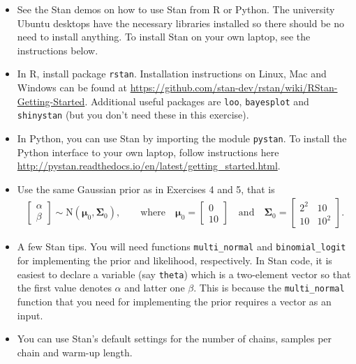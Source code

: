 \documentclass[a4paper,11pt]{article}
\newcommand{\vc}[1] { \mathbf{#1} }
\newcommand{\vs}[1] { \boldsymbol{#1} }
\begin{document}
\begin{itemize}
\item See the Stan demos on how to use Stan from R or Python. The university Ubuntu desktops have the necessary libraries installed so there should be no need to install anything. To install Stan on your own laptop, see the instructions below.

\item In R, install package {\tt rstan}. Installation instructions on Linux, Mac and Windows can be found at \url{https://github.com/stan-dev/rstan/wiki/RStan-Getting-Started}. Additional useful packages are {\tt loo}, {\tt bayesplot} and {\tt shinystan} (but you don't need these in this exercise).

\item In Python, you can use Stan by importing the module {\tt pystan}. To install the Python interface to your own laptop, follow instructions here \url{http://pystan.readthedocs.io/en/latest/getting_started.html}.

\item Use the same Gaussian prior as in Exercises 4 and 5, that is 
\begin{align*}
	\begin{bmatrix}
	\alpha \\ \beta
	\end{bmatrix}
	\sim
	\text{N} \left(\vs \mu_0, \vc \Sigma_0 \right), \qquad
	\text{where} \quad
	\vs \mu_0 = \begin{bmatrix} 0 \\ 10 \end{bmatrix} \quad \text{and} \quad
	\vc \Sigma_0 = \begin{bmatrix} 2^2 & 10 \\ 10 & 10^2 \end{bmatrix}.
\end{align*}

\item A few Stan tips. You will need functions {\tt multi\_normal} and {\tt binomial\_logit} for implementing the prior and likelihood, respectively. In Stan code, it is easiest to declare a variable (say {\tt theta}) which is a two-element vector so that the first value denotes $\alpha$ and latter one $\beta$. This is because the {\tt multi\_normal} function that you need for implementing the prior requires a vector as an input.

\item You can use Stan's default settings for the  number of chains, samples per chain and warm-up length. 


\end{itemize}
\end{document}
